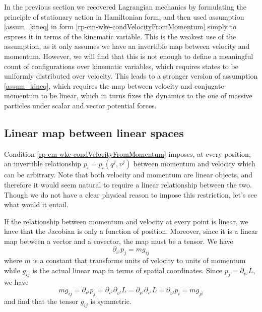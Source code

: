 In the previous section we recovered Lagrangian mechanics by formulating the principle of stationary action in Hamiltonian form, and then used assumption \ref{assum_kineq} in form \ref{rp-cm-wke-condVelocityFromMomentum} simply to express it in terms of the kinematic variable. This is the weakest use of the assumption, as it only assumes we have an invertible map between velocity and momentum. However, we will find that this is not enough to define a meaningful count of configurations over kinematic variables, which requires states to be uniformly distributed over velocity. This leads to a stronger version of assumption \ref{assum_kineq}, which requires the map between velocity and conjugate momentum to be linear, which in turns fixes the dynamics to the one of massive particles under scalar and vector potential forces.

\subsection{Linear map between linear spaces}

Condition \ref{rp-cm-wke-condVelocityFromMomentum} imposes, at every position, an invertible relationship $p_i = p_i(q^j, v^j)$ between momentum and velocity which can be arbitrary. Note that both velocity and momentum are linear objects, and therefore it would seem natural to require a linear relationship between the two. Though we do not have a clear physical reason to impose this restriction, let's see what would it entail.

If the relationship between momentum and velocity at every point is linear, we have that the Jacobian is only a function of position. Moreover, since it is a linear map between a vector and a covector, the map must be a tensor. We have
\begin{equation}\label{rp-cm-lm-metricTensor}
	\partial_{v^i} p_j = m g_{ij}
\end{equation}
where $m$ is a constant that transforms units of velocity to units of momentum while $g_{ij}$ is the actual linear map in terms of spatial coordinates. Since $p_j = \partial_{v^j} L$, we have
\begin{equation}
	m g_{ij} = \partial_{v^i} p_j = \partial_{v^i} \partial_{v^j} L = \partial_{v^j} \partial_{v^i} L  = \partial_{v^j} p_i =  m g_{ji}
\end{equation}
and find that the tensor $g_{ij}$ is symmetric.

